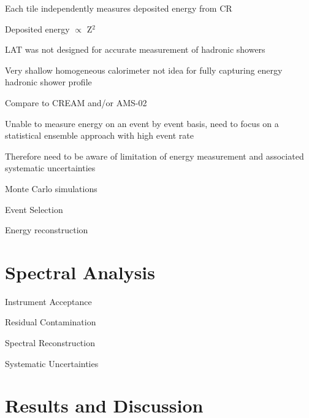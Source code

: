 \documentclass{article}
\begin{document}
\begin{myEnumerate}
\begin{myEnumerate}
\begin{myEnumerate}
					\item Each tile independently measures deposited energy from CR
					\item Deposited energy $\propto$ Z$^2$ 
				\end{myEnumerate}
				\item LAT was not designed for accurate measurement of hadronic showers
				\begin{myEnumerate}
					\item Very shallow homogeneous calorimeter not idea for fully capturing energy hadronic shower profile
					\item Compare to CREAM and/or AMS-02 
					\item Unable to measure energy on an event by event basis, need to focus on a statistical ensemble approach with high event rate
					\item Therefore need to be aware of limitation of energy measurement and associated systematic uncertainties
				\end{myEnumerate}
			\end{myEnumerate}
		\item Monte Carlo simulations
		\item Event Selection
		\item Energy reconstruction
	\end{myEnumerate}

\section{Spectral Analysis}
	\begin{myEnumerate}
		\item Instrument Acceptance
		\item Residual Contamination
		\item Spectral Reconstruction
		\item Systematic Uncertainties
	\end{myEnumerate}
\section{Results and Discussion}
\end{document}
